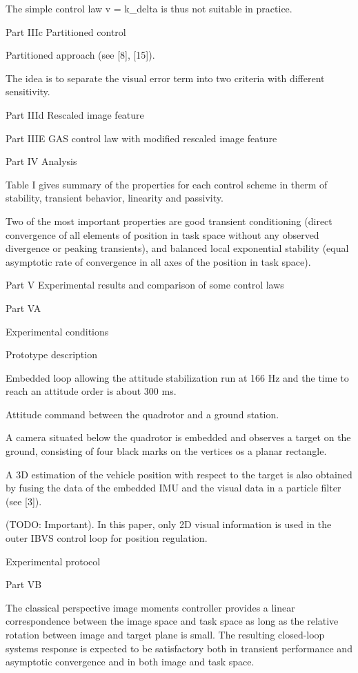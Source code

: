The simple control law v = k_delta \delta is thus not suitable in practice.

Part IIIc Partitioned control

Partitioned approach (see [8], [15]).

The idea is to separate the visual error term into two criteria with different sensitivity.

Part IIId Rescaled image feature

Part IIIE GAS control law with modified rescaled image feature

Part IV Analysis

Table I gives summary of the properties for each control scheme in therm of stability, transient behavior, linearity and passivity.

Two of the most important properties are good transient conditioning (direct convergence of all elements of position in task space without any observed divergence or peaking transients), and balanced local exponential stability (equal asymptotic rate of convergence in all axes of the position in task space).

Part V Experimental results and comparison of some control laws

Part VA

Experimental conditions

Prototype description

Embedded loop allowing the attitude stabilization run at 166 Hz and the time to reach an attitude order is about 300 ms. 

Attitude command between the quadrotor and a ground station.

A camera situated below the quadrotor is embedded and observes a target on the ground, consisting of four black marks on the vertices os a planar rectangle.


A 3D estimation of the vehicle position with respect to the target is also obtained by fusing the data of the embedded IMU and the visual data in a particle filter (see [3]).

(TODO: Important). In this paper, only 2D visual information is used in the outer IBVS control loop for position regulation.

Experimental protocol

Part VB

The classical perspective image moments controller provides a linear correspondence between the image space and task space as long as the relative rotation between image and target plane is small. The resulting closed-loop systems response is expected to be satisfactory both in transient performance and asymptotic convergence and in both image and task space.

